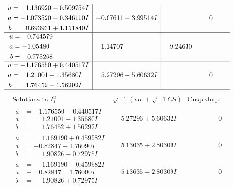 \documentclass[1p]{elsarticle_modified}
\theoremstyle{definition}
\newcommand{\I}{\sqrt{-1}}
\begin{document}
$$\begin{array}{c|c|c}
\begin{aligned}
u &= \phantom{-}1.136920 - 0.509754 I \\
a &= -1.073520 - 0.346110 I \\
b &= \phantom{-}0.693931 + 1.151840 I\end{aligned}
 & -0.67611 - 3.99514 I & \phantom{-0.000000 } 0 \\ \hline\begin{aligned}
u &= \phantom{-}0.744579\phantom{ +0.000000I} \\
a &= -1.05480\phantom{ +0.000000I} \\
b &= \phantom{-}0.775268\phantom{ +0.000000I}\end{aligned}
 & \phantom{-}1.14707\phantom{ +0.000000I} & \phantom{-}9.24630\phantom{ +0.000000I} \\ \hline\begin{aligned}
u &= -1.176550 + 0.440517 I \\
a &= \phantom{-}1.21001 + 1.35680 I \\
b &= \phantom{-}1.76452 - 1.56292 I\end{aligned}
 & \phantom{-}5.27296 - 5.60632 I & \phantom{-0.000000 } 0\\
 \hline 
 \end{array}$$\newpage$$\begin{array}{c|c|c}  
\text{Solutions to }I^u_{1}& \I (\text{vol} + \sqrt{-1}CS) & \text{Cusp shape}\\
 \hline 
\begin{aligned}
u &= -1.176550 - 0.440517 I \\
a &= \phantom{-}1.21001 - 1.35680 I \\
b &= \phantom{-}1.76452 + 1.56292 I\end{aligned}
 & \phantom{-}5.27296 + 5.60632 I & \phantom{-0.000000 } 0 \\ \hline\begin{aligned}
u &= \phantom{-}1.169190 + 0.459982 I \\
a &= -0.82847 - 1.76090 I \\
b &= \phantom{-}1.90826 - 0.72975 I\end{aligned}
 & \phantom{-}5.13635 + 2.80309 I & \phantom{-0.000000 } 0 \\ \hline\begin{aligned}
u &= \phantom{-}1.169190 - 0.459982 I \\
a &= -0.82847 + 1.76090 I \\
b &= \phantom{-}1.90826 + 0.72975 I\end{aligned}
 & \phantom{-}5.13635 - 2.80309 I & \phantom{-0.000000 } 0 \\ \hline\begin{aligned}

\end{aligned}
\end{array}$$
\end{document}
